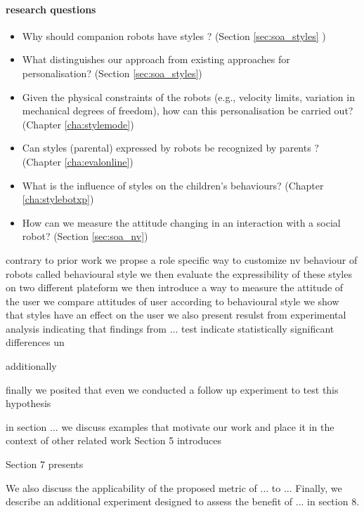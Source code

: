 \documentclass[a4paper,twocolumn]{svjour3}
\begin{document}
\paragraph{research questions}
\begin{itemize}[noitemsep,nolistsep]
	\item Why should companion robots have styles ? (Section \ref{sec:soa_styles} )
	\item What distinguishes our approach from existing approaches for personalisation? (Section \ref{sec:soa_styles})
	\item Given the physical constraints of the robots (e.g., velocity limits, variation in mechanical degrees of freedom), how can this personalisation be carried out?(Chapter \ref{cha:stylemode})
	\item Can styles (parental) expressed by robots be recognized by parents ? (Chapter \ref{cha:evalonline})
	\item What is the influence of styles on the children's behaviours? (Chapter \ref{cha:stylebotxp})
	\item How can we measure the attitude changing in an interaction with a social robot? (Section \ref{sec:soa_nv})
	\end{itemize}


contrary to prior work we propse a role specific way to customize nv behaviour of robots called behavioural style
we then evaluate the expressibility of these styles on two different plateform 
we then introduce a way to measure the attitude of the user
we compare attitudes of user according to behavioural style
we show that styles have an effect on the user
we also present resulst from experimental analysis indicating that 
findings from ... test indicate  statistically significant differences un 

additionally

finally we posited that even 
we conducted a follow up experiment to test this hypothesis

in section ... we discuss examples that motivate our work and place it in the context of other related work
Section 5 introduces

Section 7 presents 

We also discuss the applicability of the proposed metric of ... to ...
Finally, we describe an additional experiment designed to assess the benefit of ... in section 8.
\end{document}

